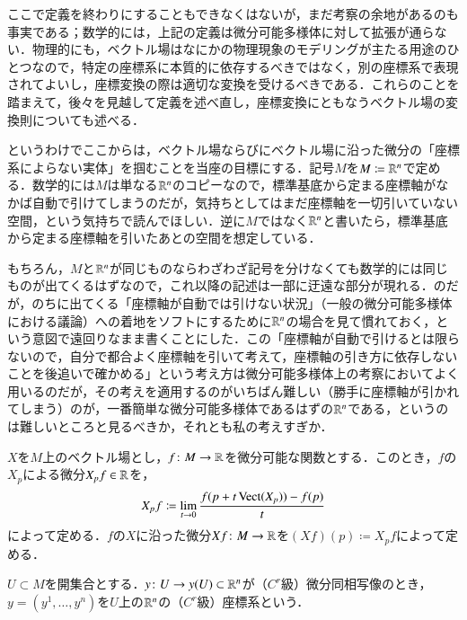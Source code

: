 ここで定義を終わりにすることもできなくはないが，まだ考察の余地があるのも事実である；数学的には，上記の定義は微分可能多様体に対して拡張が通らない．物理的にも，ベクトル場はなにかの物理現象のモデリングが主たる用途のひとつなので，特定の座標系に本質的に依存するべきではなく，別の座標系で表現されてよいし，座標変換の際は適切な変換を受けるべきである．これらのことを踏まえて，後々を見越して定義を述べ直し，座標変換にともなうベクトル場の変換則についても述べる．

というわけでここからは，ベクトル場ならびにベクトル場に沿った微分の「座標系によらない実体」を掴むことを当座の目標にする．記号$M$を$M \coloneqq \mathbb{R}^n$で定める．数学的には$M$は単なる$\mathbb{R}^n$のコピーなので，標準基底から定まる座標軸がなかば自動で引けてしまうのだが，気持ちとしてはまだ座標軸を一切引いていない空間，という気持ちで読んでほしい．逆に$M$ではなく$\mathbb{R}^n$と書いたら，標準基底から定まる座標軸を引いたあとの空間を想定している．

\begin{dig}
もちろん，$M$と$\mathbb{R}^n$が同じものならわざわざ記号を分けなくても数学的には同じものが出てくるはずなので，これ以降の記述は一部に迂遠な部分が現れる．のだが，のちに出てくる「座標軸が自動では引けない状況」（一般の微分可能多様体における議論）への着地をソフトにするために$\mathbb{R}^n$の場合を見て慣れておく，という意図で遠回りなまま書くことにした．この「座標軸が自動で引けるとは限らないので，自分で都合よく座標軸を引いて考えて，座標軸の引き方に依存しないことを後追いで確かめる」という考え方は微分可能多様体上の考察においてよく用いるのだが，その考えを適用するのがいちばん難しい（勝手に座標軸が引かれてしまう）のが，一番簡単な微分可能多様体であるはずの$\mathbb{R}^n$である，というのは難しいところと見るべきか，それとも私の考えすぎか．
\end{dig}

\begin{defi}
$X$を$M$上のベクトル場とし，$f \colon M \to \mathbb{R}$を微分可能な関数とする．このとき，$f$の$X_p$による微分$X_pf \in \mathbb{R}$を，
\begin{equation}
X_pf \coloneqq \lim_{t \to 0} \frac{f(p + t \operatorname{Vect}(X_p)) - f(p)}{t}
\end{equation}
によって定める．$f$の$X$に沿った微分$Xf \colon M \to \mathbb{R}$を$(Xf)(p) \coloneqq X_pf$によって定める．
\end{defi}

\begin{defi}
$U \subset M$を開集合とする．$y \colon U \to y(U) \subset \mathbb{R}^n$が（$C^r$級）微分同相写像のとき，$y = (y^1, \dots, y^n)$を$U$上の$\mathbb{R}^n$の（$C^r$級）座標系という．
\end{defi}

